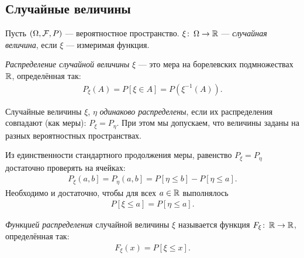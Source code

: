 \subsection{Случайные величины}

\begin{df}
 Пусть $(\Omega, \mathcal F, P)$ --- вероятностное пространство. $\xi \colon\, \Omega \to \mathbb{R}$ --- \textit{случайная величина}, если $\xi$ --- измеримая функция.
\end{df}
\begin{df}[%
]
 \textit{Распределение случайной величины} $\xi$ --- это мера на борелевских подмножествах $\mathbb{R}$, определённая так:
 \begin{align*}
  P_{\xi}(A) = P[\xi \in A] = P(\xi^{-1}(A)).
 \end{align*} 
\end{df}
\begin{df}
 Случайные величины $\xi$, $\eta$ \textit{одинаково распределены}, если их распределения совпадают (как меры): $P_{\xi} = P_{\eta}$. При этом мы допускаем, что величины заданы на разных вероятностных пространствах.
\end{df}
\begin{remrk}
 Из единственности стандартного продолжения меры, равенство $P_{\xi} = P_{\eta}$  достаточно проверять на ячейках:
 \begin{align*}
  P_{\xi} \left(a, b\right]   = P_{\eta} \left(a, b\right]  = P[\eta \leqslant b] - P[\eta \leqslant a]
 .\end{align*} Необходимо и достаточно, чтобы для всех $a \in \mathbb{R}$ выполнялось
 \begin{align*}
  P[\xi \leqslant a] = P[\eta \leqslant a].
 \end{align*} 
\end{remrk}
\begin{df}
\textit{Функцией распределения} случайной величины $\xi$ называется функция $F_{\xi} \colon\, \mathbb{R} \to \mathbb{R}$, определённая так:
 \begin{align*}
  F_{\xi}(x) = P[\xi \leqslant x].
 \end{align*} 
\end{df}
